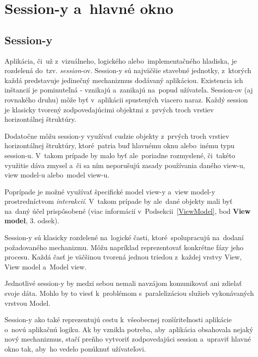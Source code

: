 \section{Session-y a~hlavné okno}\label{sessions_hlavne_okno}

\subsection{Session-y}\label{Sessions}

Aplikácia, či~už z~vizuálneho, logického alebo~implementačného hladiska, je rozdelená do~tzv. \textit{session}-ov. Session-y sú najväčšie stavebné jednotky, z~ktorých každá predstavuje jedinečný mechanizmus dodávaný aplikáciou. Existencia ich inštancií je pominuteľná - vznikajú a~zanikajú na~popud užívateľa. Session-ov (aj rovnakého druhu) môže byť v~aplikácii spustených viacero naraz. Každý session je klasicky tvorený zodpovedajúcimi objektmi z~prvých troch vrstiev horizontálnej štruktúry. 

Dodatočne môžu session-y využívať cudzie objekty z~prvých troch vrstiev horizontálnej štruktúry, ktoré~patria buď hlavnému oknu alebo~inému typu session-u. V~takom prípade by malo byť ale~poriadne rozmyslené, či~takéto  využitie dáva zmysel a~či sa ním neporušujú zasady používania daného view-u, view model-u alebo~model view-u. 

Poprípade je možné využívať špecifické model view-y a~view model-y prostredníctvom \textit{interakcií}. V~takom prípade by ale~dané objekty mali byť na~daný účel prispôsobené (viac informácií v~Podsekcii~\ref{ViewModel}, bod \textbf{View model}, 3. odsek).

Session-y sú klasicky rozdelené na~logické časti, ktoré~spolupracujú na~dodaní požadovaného mechanizmu. Môžu napríklad reprezentovať konkrétne fázy jeho procesu. Každá časť je väčšinou tvorená jednou triedou z~každej vrstvy View, View model a~Model view.  %

Jednotlivé session-y by medzi sebou nemali navzájom komunikovať ani zdielať svoje dáta. Mohlo by to viesť k~problémom s~paralelizáciou služieb vykonávaných vrstvou Model.

Session-y ako také reprezentujú cestu k~všeobecnej rozšíriteľnosti aplikácie o~novú aplikačnú logiku. Ak by vznikla potreba, aby~aplikácia obsahovala nejaký nový mechanizmus, stačí preňho vytvoriť zodpovedajúci session a~upraviť hlavné okno tak, aby~ho vedelo ponúknuť užívateľovi.  

